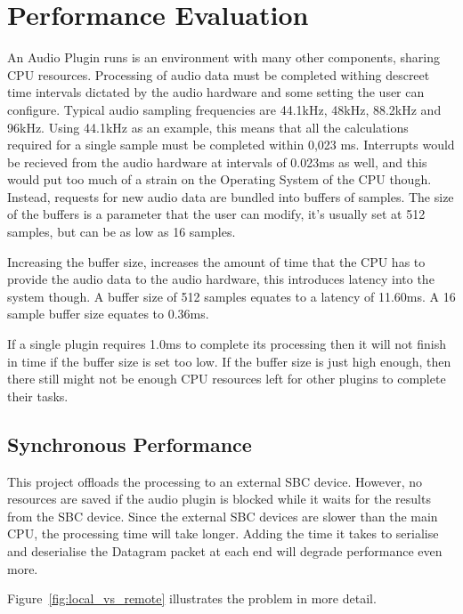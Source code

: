 \section{Performance Evaluation}

An Audio Plugin runs is an environment with many other components, sharing CPU resources. Processing of audio data must be completed withing descreet time intervals dictated by the audio hardware and some setting the user can configure. Typical audio sampling frequencies are 44.1kHz, 48kHz, 88.2kHz and 96kHz. Using 44.1kHz as an example, this means that all the calculations required for a single sample must be completed within 0,023 ms. Interrupts would be recieved from the audio hardware at intervals of 0.023ms as well, and this would put too much of a strain on the Operating System of the CPU though. Instead, requests for new audio data are bundled into buffers of samples. The size of the buffers is a parameter that the user can modify, it's usually set at 512 samples, but can be as low as 16 samples.

Increasing the buffer size, increases the amount of time that the CPU has to provide the audio data to the audio hardware, this introduces latency into the system though. A buffer size of 512 samples equates to a latency of 11.60ms. A 16 sample buffer size equates to 0.36ms.

If a single plugin requires 1.0ms to complete its processing then it will not finish in time if the buffer size is set too low. If the buffer size is just high enough, then there still might not be enough CPU resources left for other plugins to complete their tasks.

\subsection{Synchronous Performance}

This project offloads the processing to an external SBC device. However, no resources are saved if the audio plugin is blocked while it waits for the results from the SBC device. Since the external SBC devices are slower than the main CPU, the processing time will take longer. Adding the time it takes to serialise and deserialise the Datagram packet at each end will degrade performance even more.

Figure~\ref{fig:local_vs_remote} illustrates the problem in more detail.


